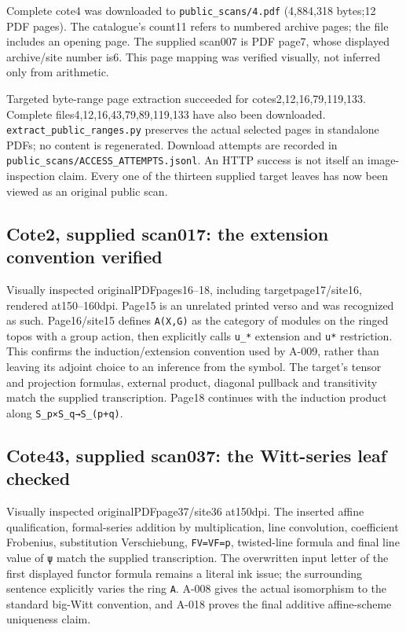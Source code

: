 \documentclass[
  10pt,
]{article}
\begin{document}
Complete cote4 was downloaded to
\texttt{\small public\_\allowbreak{}scans/\allowbreak{}4.pdf} (4,884,318
bytes;12 PDF pages). The catalogue's count11 refers to numbered archive
pages; the file includes an opening page. The supplied scan007 is PDF
page7, whose displayed archive/site number is6. This page mapping was
verified visually, not inferred only from arithmetic.

Targeted byte-range page extraction succeeded for
cotes2,12,16,79,119,133. Complete files4,12,16,43,79,89,119,133 have
also been downloaded.
\texttt{\small extract\_\allowbreak{}public\_\allowbreak{}ranges.py}
preserves the actual selected pages in standalone PDFs; no content is
regenerated. Download attempts are recorded in
\texttt{\small public\_\allowbreak{}scans/\allowbreak{}ACCESS\_\allowbreak{}ATTEMPTS.jsonl}.
An HTTP success is not itself an image-inspection claim. Every one of
the thirteen supplied target leaves has now been viewed as an original
public scan.

\subsection{Cote2, supplied scan017: the extension convention
verified}\label{cote2-supplied-scan017-the-extension-convention-verified}

Visually inspected originalPDFpages16--18, including
targetpage17/site16, rendered at150--160dpi. Page15 is an unrelated
printed verso and was recognized as such. Page16/site15 defines
\texttt{\small A(\allowbreak{}X,\allowbreak{}G)\allowbreak{}} as the
category of modules on the ringed topos with a group action, then
explicitly calls \texttt{\small u\_\allowbreak{}*} extension and
\texttt{\small u*} restriction. This confirms the induction/extension
convention used by A-009, rather than leaving its adjoint choice to an
inference from the symbol. The target's tensor and projection formulas,
external product, diagonal pullback and transitivity match the supplied
transcription. Page18 continues with the induction product along
\texttt{\small S\_\allowbreak{}p×S\_\allowbreak{}q→\allowbreak{}S\_\allowbreak{}(\allowbreak{}p+\allowbreak{}q)\allowbreak{}}.

\subsection{Cote43, supplied scan037: the Witt-series leaf
checked}\label{cote43-supplied-scan037-the-witt-series-leaf-checked}

Visually inspected originalPDFpage37/site36 at150dpi. The inserted
affine qualification, formal-series addition by multiplication, line
convolution, coefficient Frobenius, substitution Verschiebung,
\texttt{\small FV=\allowbreak{}VF=\allowbreak{}p}, twisted-line formula
and final line value of \texttt{\small ψ} match the supplied
transcription. The overwritten input letter of the first displayed
functor formula remains a literal ink issue; the surrounding sentence
explicitly varies the ring \texttt{\small A}. A-008 gives the actual
isomorphism to the standard big-Witt convention, and A-018 proves the
final additive affine-scheme uniqueness claim.
\end{document}
